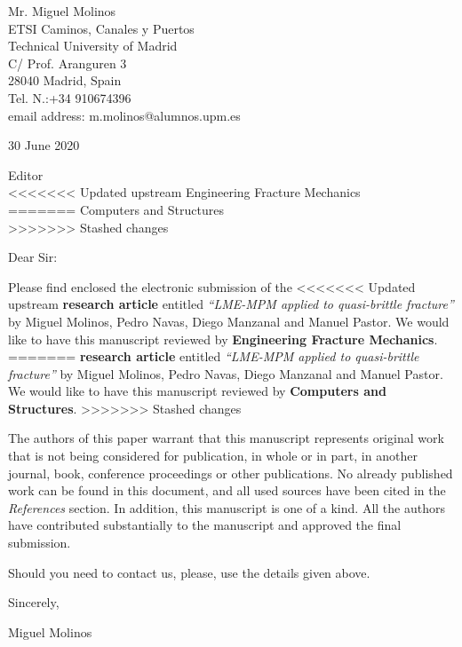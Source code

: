 \documentclass[10pt]{letter}
\begin{document}
Mr. Miguel Molinos\\
ETSI Caminos, Canales y Puertos\\
Technical University of Madrid\\
C/ Prof. Aranguren 3\\
28040 Madrid, Spain\\
Tel. N.:+34 910674396\\
email address: m.molinos@alumnos.upm.es\\

\vspace{.2in}

30 June 2020

\vspace{.3in}

Editor\\
<<<<<<< Updated upstream
Engineering Fracture Mechanics\\
=======
Computers and Structures\\
>>>>>>> Stashed changes



Dear Sir:

\vspace{.2in}

Please find enclosed the electronic submission of the
<<<<<<< Updated upstream
\textbf{research article} entitled \textit{``LME-MPM applied to
  quasi-brittle fracture''} by Miguel Molinos, Pedro Navas, Diego
Manzanal and Manuel Pastor. We would like to have this manuscript
reviewed by \textbf{Engineering Fracture Mechanics}. 
=======
\textbf{research article} entitled \textit{``LME-MPM applied to quasi-brittle fracture''} by Miguel Molinos, Pedro Navas, Diego Manzanal and Manuel Pastor. We would like to have this manuscript reviewed by \textbf{Computers and Structures}.
>>>>>>> Stashed changes

The authors of this paper warrant that this manuscript represents
original work that is not being considered for publication, in
whole or in part, in another journal, book, conference proceedings
or other publications. No already published work can be found in
this document, and all used sources have been cited in the
\textit{References} section. In addition, this manuscript is one
of a kind. All the authors have contributed substantially to the
manuscript and approved the final submission.

Should you need to contact us, please, use the details given above.



\vspace{.1in}

Sincerely,

\vspace{.3in}

Miguel Molinos
\end{document}

